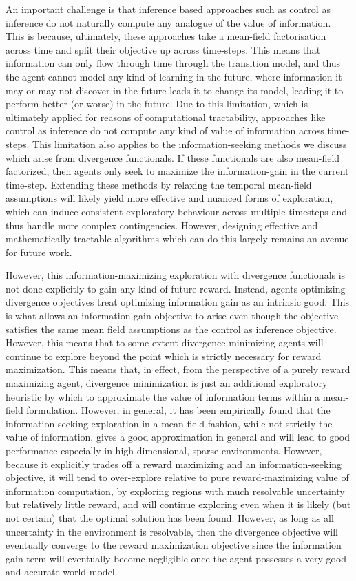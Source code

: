 An important challenge is that inference based approaches such as control as inference do not naturally compute any analogue of the value of information. This is because, ultimately, these approaches take a mean-field factorisation across time and split their objective up across time-steps. This means that information can only flow through time through the transition model, and thus the agent cannot model any kind of learning in the future, where information it may or may not discover in the future leads it to change its model, leading it to perform better (or worse) in the future. Due to this limitation, which is ultimately applied for reasons of computational tractability, approaches like control as inference do not compute any kind of value of information across time-steps. This limitation also applies to the information-seeking methods we discuss which arise from divergence functionals. If these functionals are also mean-field factorized, then agents only seek to maximize the information-gain in the current time-step. Extending these methods by relaxing the temporal mean-field assumptions will likely yield more effective and nuanced forms of exploration, which can induce consistent exploratory behaviour across multiple timesteps and thus handle more complex contingencies. However, designing effective and mathematically tractable algorithms which can do this largely remains an avenue for future work.

However, this information-maximizing exploration with divergence functionals is not done explicitly to gain any kind of future reward. Instead, agents optimizing divergence objectives treat optimizing information gain as an intrinsic good. This is what allows an information gain objective to arise even though the objective satisfies the same mean field assumptions as the control as inference objective. However, this means that to some extent divergence minimizing agents will continue to explore beyond the point which is strictly necessary for reward maximization. This means that, in effect, from the perspective of a purely reward maximizing agent, divergence minimization is just an additional exploratory heuristic by which to approximate the value of information terms within a mean-field formulation. However, in general, it has been empirically found that the information seeking exploration in a mean-field fashion, while not strictly the value of information, gives a good approximation in general and will lead to good performance especially in high dimensional, sparse environments. However, because it explicitly trades off a reward maximizing and an information-seeking objective, it will tend to over-explore relative to pure reward-maximizing value of information computation, by exploring regions with much resolvable uncertainty but relatively little reward, and will continue exploring even when it is likely (but not certain) that the optimal solution has been found. However, as long as all uncertainty in the environment is resolvable, then the divergence objective will eventually converge to the reward maximization objective since the information gain term will eventually become negligible once the agent possesses a very good and accurate world model.

